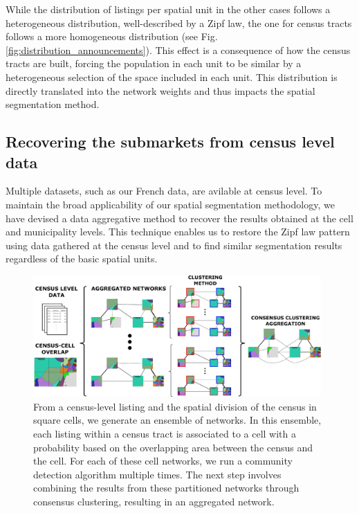 While the distribution of listings per spatial unit in the other cases follows a heterogeneous distribution, well-described by a Zipf law, the one for census tracts follows a more homogeneous distribution (see Fig. \ref{fig:distribution_announcements}). This effect is a consequence of how the census tracts are built, forcing the population in each unit to be similar by a heterogeneous selection of the space included in each unit. This distribution is directly translated into the network weights and thus impacts the spatial segmentation method. 

\subsection{Recovering the submarkets from census level data}\label{sec:data_agreggation}

Multiple datasets, such as our French data, are avilable at census level. To maintain the broad applicability of our spatial segmentation methodology, we have devised a data aggregative method to recover the results obtained at the cell and municipality levels. This technique enables us to restore the Zipf law pattern using data gathered at the census level and to find similar segmentation results regardless of the basic spatial units.

\begin{figure}
    \label{fig:stochastic_construction}
    \centering
    \includegraphics[width = 0.98\textwidth]{Figs/Idealista_segmentation/Census_cell_method.pdf}
	\caption[Stochastic aggregative method using census level data.]{ From a census-level listing and the spatial division of the census in square cells, we generate an ensemble of networks. In this ensemble, each listing within a census tract is associated to a cell with a probability based on the overlapping area between the census and the cell. For each of these cell networks, we run a community detection algorithm multiple times. The next step involves combining the results from these partitioned networks through consensus clustering, resulting in an aggregated network.}
\end{figure}

